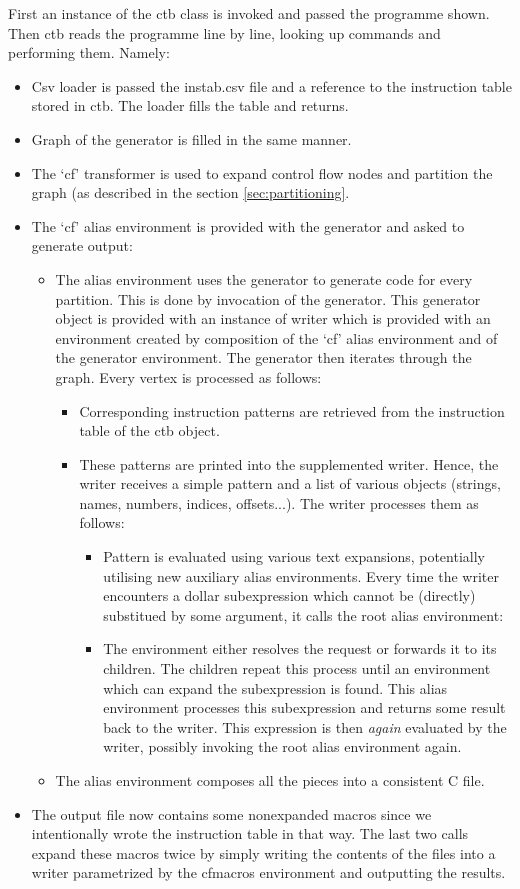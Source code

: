 First an instance of the ctb class is invoked and passed the programme shown. Then ctb reads the programme line by line, looking up commands and performing them. Namely:
\begin{itemize}
  \item Csv loader is passed the instab.csv file and a reference to the instruction table stored in ctb. The loader fills the table and returns.
  \item Graph of the generator is filled in the same manner.
  \item The `cf' transformer is used to expand control flow nodes and partition the graph (as described in the section \ref{sec:partitioning}.
  \item The `cf' alias environment is provided with the generator and asked to generate output:
  \begin{itemize}
    \item The alias environment uses the generator to generate code for every partition. This is done by invocation of the generator. This generator object is provided with an instance of writer which is provided with an environment created by composition of the `cf' alias environment and of the generator environment. The generator then iterates through the graph. Every vertex is processed as follows:
    \begin{itemize}
      \item Corresponding instruction patterns are retrieved from the instruction table of the ctb object.
      \item These patterns are printed into the supplemented writer. Hence, the writer receives a simple pattern and a list of various objects (strings, names, numbers, indices, offsets...). The writer processes them as follows:
        \begin{itemize}
          \item Pattern is evaluated using various text expansions, potentially utilising new auxiliary alias environments. Every time the writer encounters a dollar subexpression which cannot be (directly) substitued by some argument, it calls the root alias environment:
          \item The environment either resolves the request or forwards it to its children. The children repeat this process until an environment which can expand the subexpression is found. This alias environment processes this subexpression and returns some result back to the writer. This expression is then \emph{again} evaluated by the writer, possibly invoking the root alias environment again.
        \end{itemize}
    \end{itemize}
    \item The alias environment composes all the pieces into a consistent C file.
  \end{itemize}
  \item The output file now contains some nonexpanded macros since we intentionally wrote the instruction table in that way. The last two calls expand these macros twice by simply writing the contents of the files into a writer parametrized by the cfmacros environment and outputting the results.
\end{itemize}

